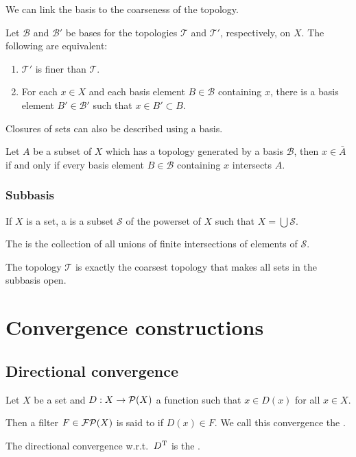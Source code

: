 We can link the basis to the coarseness of the topology.
\begin{lemma} \label{basisCoarseness}
Let $\mathcal{B}$ and $\mathcal{B}'$ be bases for the topologies $\mathcal{T}$ and $\mathcal{T}'$, respectively, on $X$. The following are equivalent:
\begin{enumerate}
\item $\mathcal{T}'$ is finer than $\mathcal{T}$.
\item For each $x\in X$ and each basis element $B\in\mathcal{B}$ containing $x$, there is a basis element $B'\in\mathcal{B'}$ such that $x\in B'\subset B$.
\end{enumerate}
\end{lemma}

Closures of sets can also be described using a basis.
\begin{lemma}
Let $A$ be a subset of $X$ which has a topology generated by a basis $\mathcal{B}$, then $x\in\bar{A}$ if and only if every basis element $B\in\mathcal{B}$ containing $x$ intersects $A$.
\end{lemma}

\subsubsection{Subbasis}
\begin{definition}
If $X$ is a set, a  is a subset $\mathcal{S}$ of the powerset of $X$ such that $X = \bigcup \mathcal{S}$.

The  is the collection of all unions of finite intersections of elements of $\mathcal{S}$. 
\end{definition}
The topology $\mathcal{T}$ is exactly the coarsest topology that makes all sets in the subbasis open.


\section{Convergence constructions}
\subsection{Directional convergence}
\begin{definition}
Let $X$ be a set and $D: X\to \operatorname{\mathcal{P}}(X)$ a function such that $x\in D(x)$ for all $x\in X$.

Then a filter $F\in \operatorname{\mathcal{FP}}(X)$ is said to  if $D(x)\in F$. We call this convergence the .

The directional convergence w.r.t.\ $D^{\mathrm{T}}$ is the .
\end{definition}

